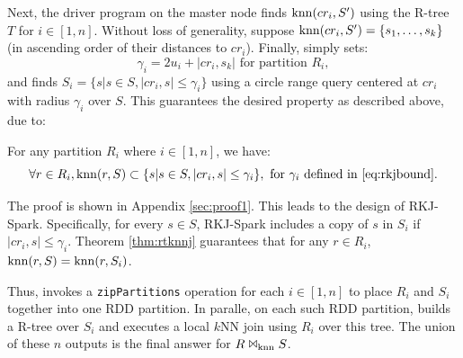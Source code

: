 Next, the driver program on the master node finds $\operatorname{knn}(cr_i, S')$
using the R-tree $T$ for $i\in[1, n]$. Without loss of generality,
suppose $\operatorname{knn}(cr_i, S')=\{s_1, \ldots, s_k\}$ (in ascending order of
their distances to $cr_i$). Finally, \name simply sets:
\begin{equation}
\label{eq:rkjbound}
 \gamma_i= 2u_i +|cr_i, s_k| \textrm{ for partition $R_i$},
\end{equation}
and finds $S_i=\{s|s \in S, |cr_i, s|\leq \gamma_i\}$ using a circle
range query centered at $cr_i$ with radius $\gamma_i$ over $S$. This
guarantees the desired property as described above, due to:
\vspace{-3mm}
\begin{theorem}
\label{thm:rtknnj}
For any partition $R_i$ where $i \in[1, n]$, we have:
\[\forall r \in R_i, \operatorname{knn}(r, S) \subset \{s|s \in S, |cr_i, s| \leq
\gamma_i\},  \textrm{ for }\gamma_i \textrm{ defined in }\eqref{eq:rkjbound}.\]
\end{theorem}
The proof is shown in Appendix \ref{sec:proof1}.  This leads to the
design of RKJ-Spark. Specifically, for every $s \in S$, RKJ-Spark
includes a copy of $s$ in $S_i$ if $|cr_i, s| \leq \gamma_i$. Theorem
\ref{thm:rtknnj} guarantees that for any $r\in R_i$, $\operatorname{knn}(r,
S)=\operatorname{knn}(r, S_i)$.

Thus, \name invokes a \texttt{zipPartitions} operation for each
$i\in[1, n]$ to place $R_i$ and $S_i$ together into one RDD
partition. In paralle, on each such RDD partition, \name builds a
R-tree over $S_i$ and executes a local $k$NN join using $R_i$ over
this tree. The union of these $n$ outputs is the final answer for
$R\Join_{\operatorname{knn}}S$.



